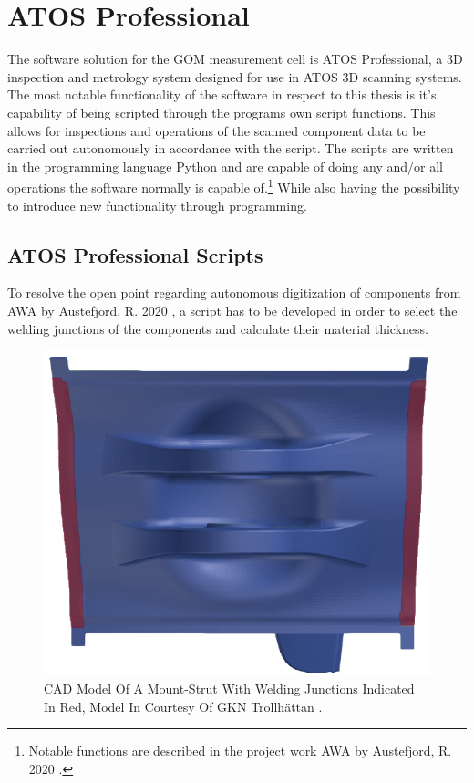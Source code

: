 \documentclass[%
]{USN-MSc}
\begin{document}
\section{ATOS Professional}
\label{sc:ATOS Professional}
The software solution for the GOM measurement cell is ATOS Professional, a 3D inspection and metrology system designed for use in ATOS 3D scanning systems. The most notable functionality of the software in respect to this thesis is it's capability of being scripted through the programs own script functions. This allows for inspections and operations of the scanned component data to be carried out autonomously in accordance with the script. The scripts are written in the programming language Python and are capable of doing any and/or all operations the software normally is capable of.\footnote{Notable functions are described in the project work AWA by Austefjord, R. 2020  \cite{Adaptive-Welding-Automation}.} While also having the possibility to introduce new functionality through programming.

\subsection{ATOS Professional Scripts}

To resolve the open point regarding autonomous digitization of components from AWA by Austefjord, R. 2020 \cite{Adaptive-Welding-Automation}, a script has to be developed in order to select the welding junctions of the components and calculate their material thickness.

\begin{figure}
\includegraphics[width=0.9\linewidth]{fig/CAD Welding Junctions.png}
\caption{CAD Model Of A Mount-Strut With Welding Junctions Indicated In Red, Model In Courtesy Of GKN Trollhättan \cite{GKN_assets}.}
\label{fig:CAD model of a Mount-Strut}
\end{figure}
\end{document}
